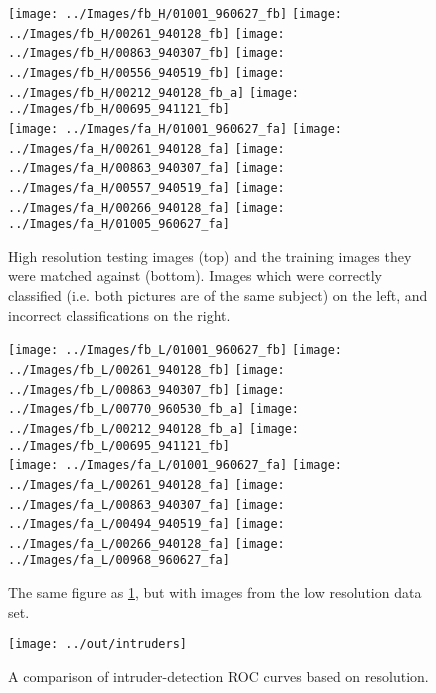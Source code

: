 \documentclass[headings=optiontoheadandtoc,listof=totoc,parskip=full]{scrartcl}
\begin{document}
\begin{figure}[H]
	\centering
	\texttt{[image: ../Images/fb\_H/01001\_960627\_fb]}
	\texttt{[image: ../Images/fb\_H/00261\_940128\_fb]}
	\texttt{[image: ../Images/fb\_H/00863\_940307\_fb]}
	\quad
	\texttt{[image: ../Images/fb\_H/00556\_940519\_fb]}
	\texttt{[image: ../Images/fb\_H/00212\_940128\_fb\_a]}
	\texttt{[image: ../Images/fb\_H/00695\_941121\_fb]}\\
	\texttt{[image: ../Images/fa\_H/01001\_960627\_fa]}
	\texttt{[image: ../Images/fa\_H/00261\_940128\_fa]}
	\texttt{[image: ../Images/fa\_H/00863\_940307\_fa]}
	\quad
	\texttt{[image: ../Images/fa\_H/00557\_940519\_fa]}
	\texttt{[image: ../Images/fa\_H/00266\_940128\_fa]}
	\texttt{[image: ../Images/fa\_H/01005\_960627\_fa]}
	\caption{High resolution testing images (top) and the training images they were matched against (bottom). Images which were correctly classified (i.e. both pictures are of the same subject) on the left, and incorrect classifications on the right.}
	\label{fig:classifications-H}
\end{figure}

\begin{figure}[H]
	\centering
	\texttt{[image: ../Images/fb\_L/01001\_960627\_fb]}
	\texttt{[image: ../Images/fb\_L/00261\_940128\_fb]}
	\texttt{[image: ../Images/fb\_L/00863\_940307\_fb]}
	\quad
	\texttt{[image: ../Images/fb\_L/00770\_960530\_fb\_a]}
	\texttt{[image: ../Images/fb\_L/00212\_940128\_fb\_a]}
	\texttt{[image: ../Images/fb\_L/00695\_941121\_fb]}\\
	\texttt{[image: ../Images/fa\_L/01001\_960627\_fa]}
	\texttt{[image: ../Images/fa\_L/00261\_940128\_fa]}
	\texttt{[image: ../Images/fa\_L/00863\_940307\_fa]}
	\quad
	\texttt{[image: ../Images/fa\_L/00494\_940519\_fa]}
	\texttt{[image: ../Images/fa\_L/00266\_940128\_fa]}
	\texttt{[image: ../Images/fa\_L/00968\_960627\_fa]}
	\caption{The same figure as \cref{fig:classifications-H}, but with images from the low resolution data set.}
	\label{fig:classifications-L}
\end{figure}

\begin{figure}[H]
    \centering
    \texttt{[image: ../out/intruders]}
    \caption{A comparison of intruder-detection ROC curves based on resolution.}
    \label{fig:intruders}
\end{figure}
\end{document}
